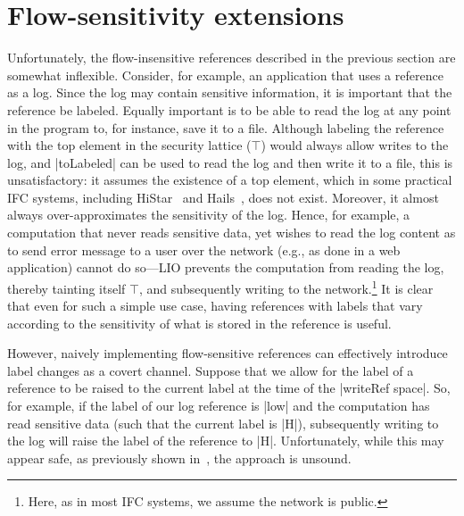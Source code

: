\section{Flow-sensitivity extensions}
\label{sec:flow-sensitive}

Unfortunately, the flow-insensitive references described in the previous section
are somewhat inflexible.
%
Consider, for example, an application that uses a reference as a log.
%
Since the log may contain sensitive information, it is important that the
reference be labeled.
%
Equally important is to be able to read the log at any point in the program to,
for instance, save it to a file.
%
Although labeling the reference with the top element in the security
lattice ($\top$) would always allow writes to the log, and |toLabeled|
can be used to read the log and then write it to a file, this is
unsatisfactory: it assumes the existence of a top element, which in
some practical IFC systems, including HiStar~\cite{zeldovich:histar}
and Hails~\cite{giffin:hails}, does not exist.
%
Moreover, it almost always over-approximates the sensitivity of the
log.
%
Hence, for example, a computation that never reads sensitive data, yet
wishes to read the log content as to send error message to a user over
the network (e.g., as done in a web application) cannot do so---LIO
prevents the computation from reading the log, thereby tainting itself
$\top$, and subsequently writing to the network.\footnote{
  Here, as in most IFC systems, we assume the network is public.
}
%
It is clear that even for such a simple use case, having references
with labels that vary according to the sensitivity of what is stored
in the reference is useful.

However, naively implementing flow-sensitive references can effectively
introduce label changes as a covert channel. 
%
Suppose that we allow for the label of a reference to be raised to the
current label at the time of the |writeRef space|.
%
So, for example, if the label of our log reference is |low| and the
computation has read sensitive data (such that the current label is
|H|), subsequently writing to the log will raise the label of the
reference to |H|.
%
Unfortunately, while this may appear safe, as previously shown
in~\cite{Austin:Flanagan:PLAS09,Russo:2010, Austin:Flanagan:PLAS10},
the approach is unsound.

